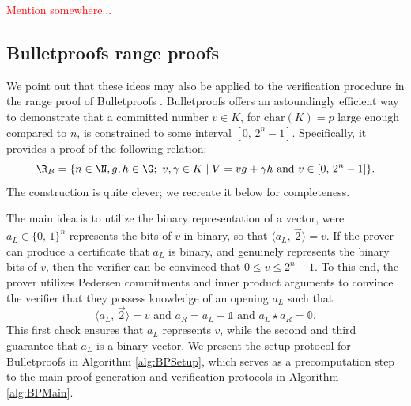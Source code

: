 \documentclass[11pt,letterpaper]{article}
\newcommand{\free}[1]{{\textcolor{red}{#1}}}
\theoremstyle{definition}
\newcommand{\6}{\mathbf}
\newcommand{\7}{\mathcal}
\newcommand{\ip}[2]{{\langle {#1}, \, {#2} \rangle}}
\newcommand{\zon}{\{0, \, 1\}^n}
\newcommand{\one}{\mathbb{1}}
\newcommand{\zero}{\mathbb{0}}
\begin{document}
\free{Mention \cite{PlausibleAttack} somewhere...}










\subsection{Bulletproofs range proofs}

We point out that these ideas may also be applied to the verification procedure in the range proof of Bulletproofs \cite{Bullet}.
Bulletproofs offers an astoundingly efficient way to demonstrate that a committed number $v \in K$, for $\text{char}(K) = p$ large enough compared to $n$, is constrained to some interval $[0, \, 2^n-1]$. Specifically, it provides a proof of the following relation:
$$\R_{B} = \{n \in \N, g, h \in \G; \ v, \gamma \in K \mid V = vg + \gamma h \text{ and } v \in [0, \, 2^n-1]\}.$$
The construction is quite clever; we recreate it below for completeness.


The main idea is to utilize the binary representation of a vector, were $a_L \in \zon$ represents the bits of $v$ in binary, so that $\ip{a_L}{\vec{2}} = v$.
If the prover can produce a certificate that $a_L$ is binary, and genuinely represents the binary bits of $v$, then the verifier can be convinced that $0 \leq v \leq 2^n-1$.
To this end, the prover utilizes Pedersen commitments and inner product arguments to convince the verifier that they possess knowledge of an opening $a_L$  such that 
$$\ip{a_L}{\vec{2}} = v \text{ and } a_R = a_L - \one \text{ and } a_L \star a_R = \zero.$$
This first check ensures that $a_L$ represents $v$, while the second and third guarantee that $a_L$ is a binary vector.
We present the setup protocol for Bulletproofs in Algorithm \ref{alg:BPSetup}, which serves as a precomputation step to the main proof generation and verification protocols in Algorithm \ref{alg:BPMain}.
\end{document}
